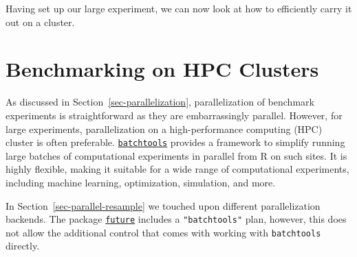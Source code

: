 Having set up our large experiment, we can now look at how to
efficiently carry it out on a cluster.

\hypertarget{sec-hpc-exec}{%
\section{Benchmarking on HPC Clusters}\label{sec-hpc-exec}}

As discussed in Section~\ref{sec-parallelization}, parallelization of
benchmark experiments is straightforward as they are embarrassingly
parallel. However, for large experiments,
parallelization on a high-performance
computing (HPC) cluster is often preferable.
\href{https://cran.r-project.org/package=batchtools}{\texttt{batchtools}}
provides a framework to simplify running large batches of computational
experiments in parallel from R on such sites. It is highly flexible,
making it suitable for a wide range of computational experiments,
including machine learning, optimization, simulation, and more.

\begin{tcolorbox}[enhanced jigsaw, opacitybacktitle=0.6, rightrule=.15mm, opacityback=0, arc=.35mm, breakable, titlerule=0mm, colframe=quarto-callout-tip-color-frame, coltitle=black, bottomrule=.15mm, toprule=.15mm, colback=white, colbacktitle=quarto-callout-tip-color!10!white, bottomtitle=1mm, toptitle=1mm, title=\textcolor{quarto-callout-tip-color}{\faLightbulb}\hspace{0.5em}{\texttt{"batchtools"} backend for \texttt{future}}, leftrule=.75mm, left=2mm]

In Section~\ref{sec-parallel-resample} we touched upon different
parallelization backends. The package
\href{https://cran.r-project.org/package=future}{\texttt{future}}
includes a \texttt{"batchtools"} plan, however, this does not allow the
additional control that comes with working with \texttt{batchtools}
directly.

\end{tcolorbox}

